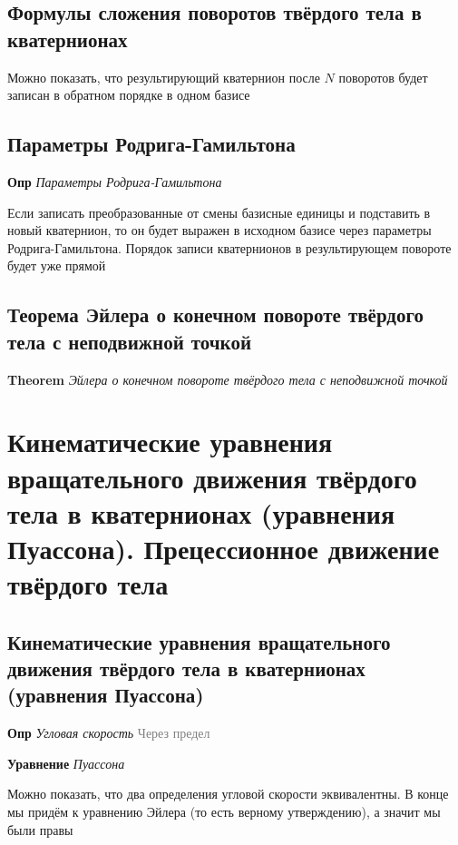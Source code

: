 \documentclass[a4paper, 14pt]{article}
\begin{document}
    \subsection{Формулы сложения поворотов твёрдого тела в кватернионах}
    
    Можно показать, что результирующий кватернион после $N$ поворотов будет записан в обратном порядке в одном базисе
    
    \subsection{Параметры Родрига-Гамильтона}
    
    \textbf{Опр} \textit{Параметры Родрига-Гамильтона}
    
    Если записать преобразованные от смены базисные единицы и подставить в новый кватернион, то он будет выражен в
    исходном базисе через параметры Родрига-Гамильтона.
    Порядок записи кватернионов в результирующем повороте будет уже прямой
    
    \subsection{Теорема Эйлера о конечном повороте твёрдого тела с неподвижной точкой}
    
    \textbf{Theorem} \textit{Эйлера о конечном повороте твёрдого тела с неподвижной точкой}
    
    \section{Кинематические уравнения вращательного движения твёрдого тела в кватернионах (уравнения Пуассона).
    Прецессионное движение твёрдого тела}
    
    \subsection{Кинематические уравнения вращательного движения твёрдого тела в кватернионах (уравнения Пуассона)}
    
    \textbf{Опр} \textit{Угловая скорость} \textcolor{gray}{Через предел}
    
    \textbf{Уравнение} \textit{Пуассона}
    
    Можно показать, что два определения угловой скорости эквивалентны.
    В конце мы придём к уравнению Эйлера (то есть верному утверждению), а значит мы были правы
    
\end{document}
